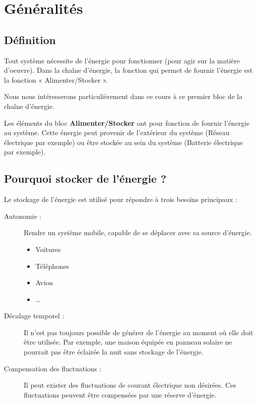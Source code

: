 \documentclass[10pt,fleqn]{article} %
\begin{document}

\section{Généralités}
\subsection{Définition}
Tout système nécessite de l’énergie pour fonctionner (pour agir sur la matière d'oeuvre). Dans la chaîne d’énergie, la fonction qui permet de fournir l’énergie est la fonction « Alimenter/Stocker ».

Nous nous intéresserons particulièrement dans ce cours à ce premier bloc de la chaîne d'énergie. 

\begin{defi}
    Les éléments du bloc \textbf{Alimenter/Stocker} ont pour fonction de fournir l'énergie au système. Cette énergie peut provenir de l'extérieur du système (Réseau électrique par exemple) ou être stockée au sein du système (Batterie électrique par exemple). 
\end{defi}


\subsection{Pourquoi stocker de l'énergie ?}
Le stockage de l'énergie est utilisé pour répondre à trois besoins principaux : 
\begin{description}
    \item[Autonomie : ] Rendre un système mobile, capable de se déplacer avec sa source d'énergie.
    \begin{itemize}
        \item Voitures
        \item Téléphones 
        \item Avion
        \item \dots
    \end{itemize}
    \item[Décalage temporel : ] Il n'est pas toujours possible de générer de l'énergie au moment où elle doit être utilisée. Par exemple, une maison équipée en panneau solaire ne pourrait pas être éclairée la nuit sans stockage de l'énergie.  
    \item[Compensation des fluctuations : ]Il peut exister des fluctuations de courant électrique non désirées. Ces fluctuations peuvent être compensées par une réserve d'énergie. 
\end{description}
\end{document}
